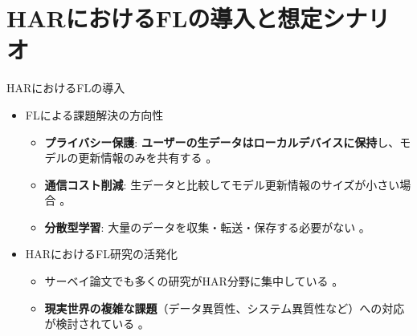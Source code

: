 \documentclass[unicode,12pt,aspectratio=169,dvipdfmx]{beamer}
\begin{document}
\section{HARにおけるFLの導入と想定シナリオ}
\begin{frame}{HARにおけるFLの導入}
    \begin{itemize}
        \item FLによる課題解決の方向性 \cite{Source410, Source416}
        \begin{itemize}
            \item \textbf{プライバシー保護}: \textbf{ユーザーの生データはローカルデバイスに保持}し、モデルの更新情報のみを共有する \cite{Source410, Source416}。
            \item \textbf{通信コスト削減}: 生データと比較してモデル更新情報のサイズが小さい場合 \cite{Source254, Source410}。
            \item \textbf{分散型学習}: 大量のデータを収集・転送・保存する必要がない \cite{Source410}。
        \end{itemize}
        \item HARにおけるFL研究の活発化
        \begin{itemize}
            \item サーベイ論文でも多くの研究がHAR分野に集中している \cite{Source101}。
            \item \textbf{現実世界の複雑な課題}（データ異質性、システム異質性など）への対応が検討されている \cite{Source55}。
        \end{itemize}
    \end{itemize}
\end{frame}
\end{document}
